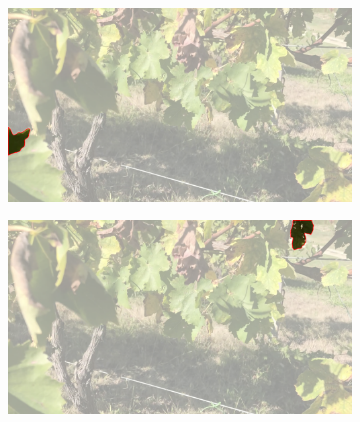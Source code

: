 \documentclass[runningheads]{llncs}
\begin{document}
\begin{figure}[h!]
\centering
\begin{subfigure}[b]{.33\linewidth}
\includegraphics[width=\linewidth]{imgs/18_over_healthy_033_cam3.png}
\caption{}
\label{fig:sam1a}
\end{subfigure}
\begin{subfigure}[b]{.33\linewidth}
\includegraphics[width=\linewidth]{imgs/19_over_healthy_033_cam3.png}
\caption{}
\label{fig:sam1b}
\end{subfigure}%



\end{figure}
\end{document}

